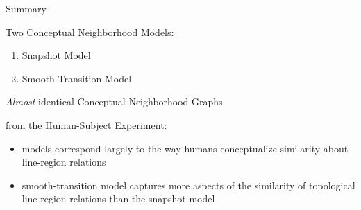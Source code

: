 
\begin{frame}{Summary}
	\begin{block}{Two Conceptual Neighborhood Models:}
		
		\begin{enumerate}	
			\item Snapshot Model
			
			\item Smooth-Transition Model
		\end{enumerate}
		
		 \textit{Almost} identical Conceptual-Neighborhood Graphs
	\end{block}
	\vspace{6pt}
	\begin{block}{ from the Human-Subject Experiment:}
		\begin{itemize}
			\item models correspond largely to the way humans conceptualize similarity about line-region relations
			
			\item smooth-transition model captures more aspects of the similarity of topological line-region relations than the snapshot model
		\end{itemize}
	\end{block}
\end{frame}

\begin{comment}
The smooth-transition model represented the change process explicitly, whereas the snapshot model inferred change from topological differences.
\end{comment}